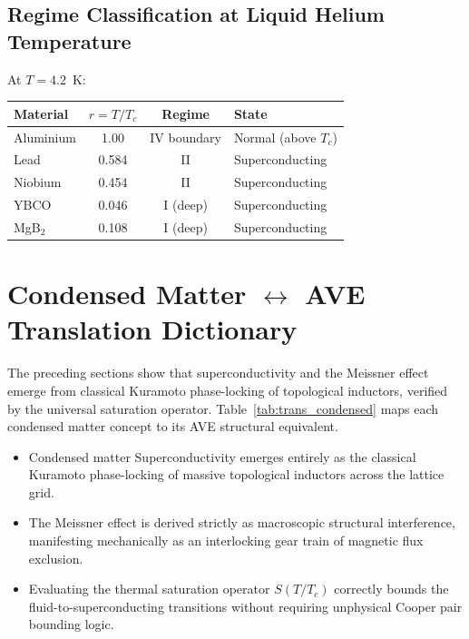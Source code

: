 \subsection{Regime Classification at Liquid Helium Temperature}

At $T = 4.2$~K:
\begin{center}
\begin{tabularx}{\textwidth}{@{}lccX@{}}
\toprule
\textbf{Material} & $r = T/T_c$ & \textbf{Regime} & \textbf{State} \\
\midrule
Aluminium & 1.00  & IV boundary & Normal (above $T_c$) \\
Lead      & 0.584 & II          & Superconducting \\
Niobium   & 0.454 & II          & Superconducting \\
YBCO      & 0.046 & I (deep)    & Superconducting \\
MgB$_2$   & 0.108 & I (deep)    & Superconducting \\
\bottomrule
\end{tabularx}
\end{center}

\section{Condensed Matter $\leftrightarrow$ AVE Translation Dictionary}
\label{sec:cm_ave_translation}

The preceding sections show that superconductivity and the Meissner effect emerge from classical Kuramoto phase-locking of topological inductors, verified by the universal saturation operator.  Table~\ref{tab:trans_condensed} maps each condensed matter concept to its AVE structural equivalent.



\begin{summarybox}
\begin{itemize}
    \item Condensed matter Superconductivity emerges entirely as the classical Kuramoto phase-locking of massive topological inductors across the lattice grid.
    \item The Meissner effect is derived strictly as macroscopic structural interference, manifesting mechanically as an interlocking gear train of magnetic flux exclusion.
    \item Evaluating the thermal saturation operator $S(T/T_c)$ correctly bounds the fluid-to-superconducting transitions without requiring unphysical Cooper pair bounding logic.
\end{itemize}
\end{summarybox}

